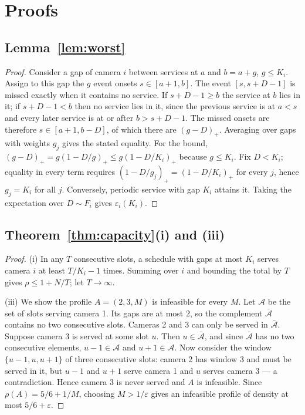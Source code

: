 \documentclass[preprint,review,12pt]{elsarticle}
\theoremstyle{definition}
\newcommand{\Nc}{N}
\newcommand{\Ki}{K_i}
\newcommand{\dens}{\rho}
\newcommand{\Dur}{D}
\newcommand{\pos}[1]{(#1)_{+}}
\begin{document}
\appendix
\section{Proofs}\label{app:proofs}

\subsection*{Lemma~\ref{lem:worst}}
\begin{proof}
Consider a gap of camera $i$ between services at $a$ and $b=a+g$, $g\le\Ki$. Assign to this gap
the $g$ event onsets $s\in[a+1,b]$. The event $[s,s+\Dur-1]$ is missed exactly when it contains no
service. If $s+\Dur-1\ge b$ the service at $b$ lies in it; if $s+\Dur-1<b$ then no service lies in
it, since the previous service is at $a<s$ and every later service is at or after $b>s+\Dur-1$.
The missed onsets are therefore $s\in[a+1,b-\Dur]$, of which there are $\pos{g-\Dur}$. Averaging
over gaps with weights $g_j$ gives the stated equality. For the bound, $\pos{g-\Dur}=g\pos{1-\Dur/g}
\le g\pos{1-\Dur/\Ki}$ because $g\le\Ki$. Fix $\Dur<\Ki$; equality in every term requires
$\pos{1-\Dur/g_j}=\pos{1-\Dur/\Ki}$ for every $j$, hence $g_j=\Ki$ for all $j$. Conversely,
periodic service with gap $\Ki$ attains it. Taking the expectation over $\Dur\sim F_i$ gives
$\varepsilon_i(\Ki)$.
\end{proof}

\subsection*{Theorem~\ref{thm:capacity}(i) and (iii)}
\begin{proof}
(i) In any $T$ consecutive slots, a schedule with gaps at most $\Ki$ serves camera $i$ at least
$T/\Ki-1$ times. Summing over $i$ and bounding the total by $T$ gives $\dens\le1+\Nc/T$; let
$T\to\infty$.

(iii) We show the profile $A=(2,3,M)$ is infeasible for every $M$. Let $\mathcal{A}$ be the set of
slots serving camera 1. Its gaps are at most $2$, so the complement $\bar{\mathcal{A}}$ contains no
two consecutive slots. Cameras 2 and 3 can only be served in $\bar{\mathcal{A}}$. Suppose camera 3
is served at some slot $u$. Then $u\in\bar{\mathcal{A}}$, and since $\bar{\mathcal{A}}$ has no two
consecutive elements, $u-1\in\mathcal{A}$ and $u+1\in\mathcal{A}$. Now consider the window
$\{u-1,u,u+1\}$ of three consecutive slots: camera 2 has window $3$ and must be served in it, but
$u-1$ and $u+1$ serve camera 1 and $u$ serves camera 3 --- a contradiction. Hence camera 3 is
never served and $A$ is infeasible. Since $\dens(A)=5/6+1/M$, choosing $M>1/\varepsilon$ gives an
infeasible profile of density at most $5/6+\varepsilon$.
\end{proof}
\end{document}
